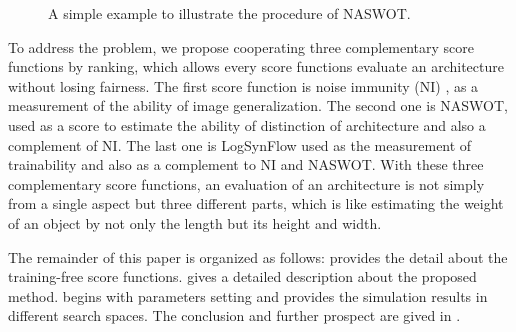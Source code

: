 \documentclass[sigconf]{acmart}
\begin{document}
    \begin{figure*}[b]
        \vspace{-\baselineskip}
        \caption{A simple example to illustrate the procedure of NASWOT.}
        \label{fig:naswot}
        \centering
        \vspace{-\baselineskip}
    \end{figure*}
    To address the problem, we propose cooperating three complementary 
    score functions by ranking, which allows every score functions 
    evaluate an architecture without losing fairness. 
    The first score function is noise immunity (NI) \cite{10092788}, as 
    a measurement of the ability of image generalization. 
    The second one is NASWOT, used as a score to estimate the ability of distinction 
    of architecture and also a complement of NI. 
    The last one is LogSynFlow used as the measurement of trainability 
    and also as a complement to NI and NASWOT. 
    With these three complementary score functions, an evaluation of an 
    architecture is not simply from a single aspect but three different 
    parts, which is like estimating the weight of an object by not only 
    the length but its height and width. 


    The remainder of this paper is organized as follows: 
     provides the detail about the training-free 
    score functions.  gives a detailed 
    description about the proposed method.  begins 
    with parameters setting and provides the simulation results in 
    different search spaces. The conclusion and further 
    prospect are gived in .
\end{document}
